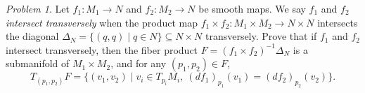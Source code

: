 \documentclass[11pt,twoside]{amsart}
\theoremstyle{plain}
\theoremstyle{remark}
\newtheorem{prob}{Problem}
\theoremstyle{definition}
\theoremstyle{definition}
\begin{document}
\begin{prob}
Let $f_1\colon M_1\to N$ and $f_2\colon M_2\to N$ be smooth maps. We say $f_1$ and $f_2$ \emph{intersect transversely} when the product map $f_1\times f_2\colon M_1\times M_2\to N\times N$ intersects the diagonal $\Delta_N = \{(q,q)\mid q\in N\}\subseteq N\times N$ transversely. Prove that if $f_1$ and $f_2$ intersect transversely, then the fiber product $F = (f_1\times f_2)^{-1}\Delta_N$ is a submanifold of $M_1\times M_2$, and for any $(p_1,p_2)\in F$,
\[
  T_{(p_1,p_2)}F = \{(v_1,v_2)\mid v_i\in T_{p_i}M_i,~(df_1)_{p_1}(v_1) = (df_2)_{p_2}(v_2)\}.
\]
\end{prob}
\end{document}
